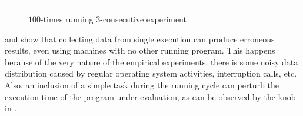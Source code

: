 \begin{figure}
  \centering
  \begin{minipage}[t]{\linewidth}
    \vspace{1em}
    \hrule
    \vspace{1em}
  \end{minipage}
  \caption{$100$-times running $3$-consecutive experiment}
  \label{fig:CProbust}
\end{figure}

 and  show that collecting data from single execution can produce erroneous results, even using machines with no other running program. This happens because of the very nature of the empirical experiments, there is some noisy data distribution caused by regular operating system activities, interruption calls, etc. Also, an inclusion of a simple task during the running cycle can perturb the execution time of the program under evaluation, as can be observed by the knob in .

